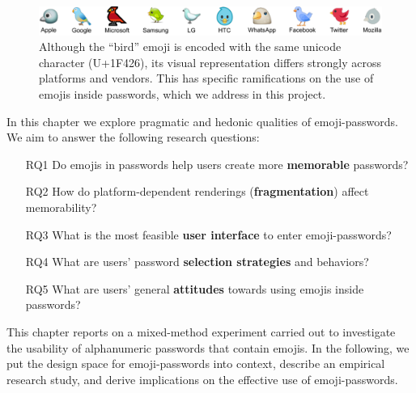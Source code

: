 \begin{figure}
	\centering
	\includegraphics[width=\linewidth]{figures/emojipasswords/emoji-bird-comparison}
	\caption{
		\label{fig:emojipasswords:emoji-bird-comparison}
		Although the ``bird'' emoji is encoded with the same unicode character (U+1F426), its visual representation differs strongly across platforms and vendors. This has specific ramifications on the use of emojis inside passwords, which we address in this project.
	}
\end{figure}

In this chapter we explore pragmatic and hedonic qualities of emoji-passwords. We aim to answer the following research questions:
\begin{itemize}
	\item[RQ1] Do emojis in passwords help users create more \textbf{memorable} passwords?
	\item[RQ2] How do platform-dependent renderings (\textbf{fragmentation}) affect memorability?
	\item[RQ3] What is the most feasible \textbf{user interface} to enter emoji-passwords?
	\item[RQ4] What are users' password \textbf{selection strategies} and behaviors?
	\item[RQ5] What are users' general \textbf{attitudes} towards using emojis inside passwords?
\end{itemize}

This chapter reports on a mixed-method experiment carried out to investigate the usability of alphanumeric passwords that contain emojis. In the following, we put the design space for emoji-passwords into context, describe an empirical research study, and derive implications on the effective use of emoji-passwords.



